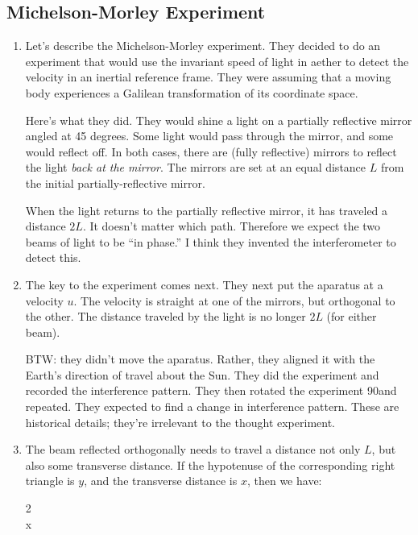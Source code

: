 \subsection{Michelson-Morley Experiment}

\begin{enumerate}

  \item Let's describe the Michelson-Morley experiment. They decided to
  do an experiment that would use the invariant speed of light in aether
  to detect the velocity in an inertial reference frame. They were
  assuming that a moving body experiences a Galilean transformation of
  its coordinate space.

  Here's what they did. They would shine a light on a partially
  reflective mirror angled at 45 degrees. Some light would pass through
  the mirror, and some would reflect off. In both cases, there are
  (fully reflective) mirrors to reflect the light \emph{back at the
  mirror}. The mirrors are set at an equal distance $L$ from the initial
  partially-reflective mirror.

  When the light returns to the partially reflective mirror, it has
  traveled a distance $2L$. It doesn't matter which path. Therefore we
  expect the two beams of light to be ``in phase.'' I think they
  invented the interferometer to detect this.

  \item The key to the experiment comes next. They next put the aparatus
  at a velocity $u$. The velocity is straight at one of the mirrors, but
  orthogonal to the other. The distance traveled by the light is no
  longer $2L$ (for either beam).

  BTW: they didn't move the aparatus. Rather, they aligned it with the
  Earth's direction of travel about the Sun. They did the experiment and
  recorded the interference pattern. They then rotated the experiment
  90\degree and repeated. They expected to find a change in interference
  pattern. These are historical details; they're irrelevant to the
  thought experiment.

  \item The beam reflected orthogonally needs to travel a distance not
  only $L$, but also some transverse distance. If the hypotenuse of the
  corresponding right triangle is $y$, and the transverse distance is
  $x$, then we have:

  \begin{nedqn}
    2
  \\
    x
  \eqcol
  \end{nedqn}


\end{enumerate}
